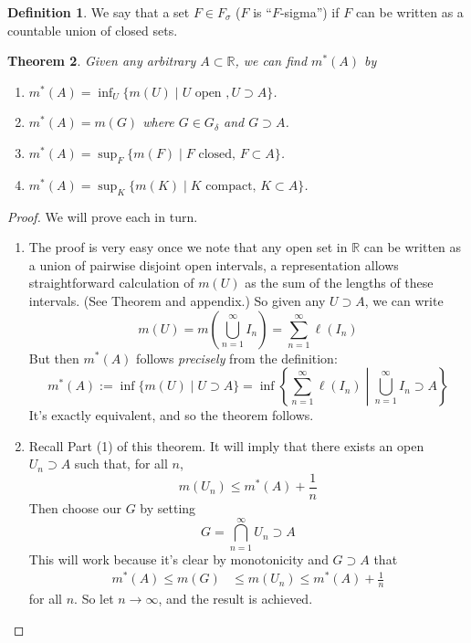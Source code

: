 \documentclass[12pt]{article}
\theoremstyle{plain}
\newtheorem{thm}{Theorem}[subsection]
\theoremstyle{definition}
\newtheorem{defn}[thm]{Definition}
\theoremstyle{remark}
\begin{document}
\begin{defn}
We say that a set $F\in F_\sigma$ ($F$ is ``$F$-sigma'') if $F$ can be written as a countable union of closed sets.
\end{defn}

\begin{thm}
\label{lebreg}
Given \emph{any} arbitrary $A\subset\mathbb{R}$, we can find $m^*(A)$ by
\begin{enumerate}

\item $m^*(A) = \inf_{U} \{m(U) \; | \; U \text{ open }, U\supset A\}$.

\item $m^*(A) = m(G)$ where $G\in G_\delta$ and $G\supset A$.

\item $m^*(A) = \sup_{F} \{m(F) \; | \; F \text{ closed, }
F\subset A\}$.

\item $m^*(A) = \sup_{K} \{m(K) \; | \; K \text{ compact, }
K\subset A\}$.

\end{enumerate}
\end{thm}
\begin{proof}
We will prove each in turn.
\begin{enumerate}
\item The proof is very easy once we note that any open set in $\mathbb{R}$ can be written as a union of pairwise disjoint open intervals, a representation allows straightforward calculation of $m(U)$ as the sum of the lengths of these intervals. (See Theorem and appendix.) So given any $U\supset A$, we can write
\[
    m(U) = m\left(\bigcup^\infty_{n=1} I_n\right) = 
    \sum^\infty_{n=1} \ell(I_n)
\]
But then $m^*(A)$ follows \emph{precisely} from the definition:
\[
    m^*(A) := \inf \{m(U) \; |\; U\supset A\} 
    = \inf \left\{ \left.\sum^\infty_{n=1}\ell(I_n) \; 
        \right\rvert\; 
    \bigcup^\infty_{n=1} I_n \supset A\right\}  
\]
It's exactly equivalent, and so the theorem follows.

\item Recall Part (1) of this theorem. It will imply that there exists an open $U_n\supset A$ such that, for all $n$,
\[
    m(U_n) \leq m^*(A) + \frac{1}{n}
\]
Then choose our $G$ by setting
\[
    G = \bigcap^\infty_{n=1} U_n \supset A
\]
This will work because it's clear by monotonicity and $G\supset A$ that
\begin{align*}
    m^*(A) \leq m(G) &\leq m(U_n) 
    \leq m^*(A) + \frac{1}{n} 
\end{align*}
for all $n$. So let $n\rightarrow\infty$, and the result is achieved.
\end{enumerate}
\end{proof}
\end{document}
